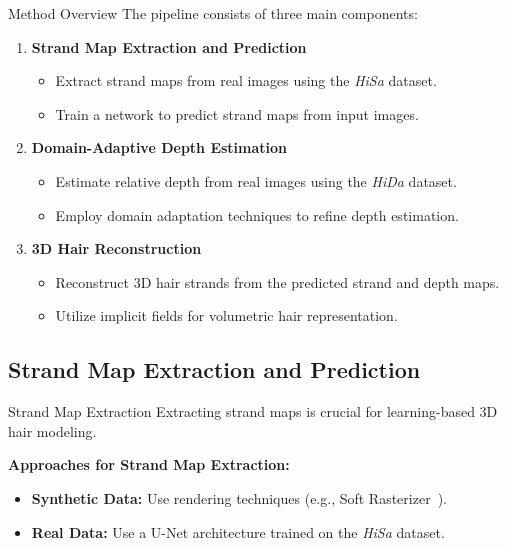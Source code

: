\begin{frame}[t]{Method Overview}
    The pipeline consists of three main components:
    \begin{enumerate}
        \item \textbf{Strand Map Extraction and Prediction}
        \begin{itemize}
            \item Extract strand maps from real images using the \emph{HiSa} dataset.
            \item Train a network to predict strand maps from input images.
        \end{itemize}

        \item \textbf{Domain-Adaptive Depth Estimation}
        \begin{itemize}
            \item Estimate relative depth from real images using the \emph{HiDa} dataset.
            \item Employ domain adaptation techniques to refine depth estimation.
        \end{itemize}

        \item \textbf{3D Hair Reconstruction}
        \begin{itemize}
            \item Reconstruct 3D hair strands from the predicted strand and depth maps.
            \item Utilize implicit fields for volumetric hair representation.
        \end{itemize}
    \end{enumerate}
\end{frame}

\subsection{Strand Map Extraction and Prediction}

\begin{frame}[t]{Strand Map Extraction}
    Extracting strand maps is crucial for learning-based 3D hair modeling.

    \vspace{5pt}

    \textbf{Approaches for Strand Map Extraction:}
    \begin{itemize}
        \item \textbf{Synthetic Data:} Use rendering techniques (e.g., Soft Rasterizer~\cite{liu2019softras}).
        \item \textbf{Real Data:} Use a U-Net architecture trained on the \emph{HiSa} dataset.
    \end{itemize}
\end{frame}

